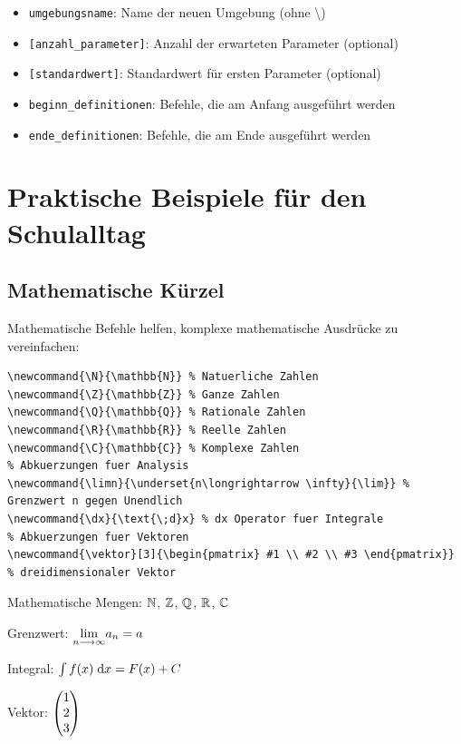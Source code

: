 \begin{itemize}
    \item \texttt{umgebungsname}: Name der neuen Umgebung (ohne \textbackslash)
    \item \texttt{[anzahl\_parameter]}: Anzahl der erwarteten Parameter (optional)
    \item \texttt{[standardwert]}: Standardwert für ersten Parameter (optional)
    \item \texttt{beginn\_definitionen}: Befehle, die am Anfang ausgeführt werden
    \item \texttt{ende\_definitionen}: Befehle, die am Ende ausgeführt werden
\end{itemize}

\newpage


\section{Praktische Beispiele für den Schulalltag}



\subsection{Mathematische Kürzel}

Mathematische Befehle helfen, komplexe mathematische Ausdrücke zu vereinfachen:

\begin{lstlisting}[style=latex]
% Zahlenbereiche
\newcommand{\N}{\mathbb{N}} % Natuerliche Zahlen
\newcommand{\Z}{\mathbb{Z}} % Ganze Zahlen
\newcommand{\Q}{\mathbb{Q}} % Rationale Zahlen
\newcommand{\R}{\mathbb{R}} % Reelle Zahlen
\newcommand{\C}{\mathbb{C}} % Komplexe Zahlen
% Abkuerzungen fuer Analysis
\newcommand{\limn}{\underset{n\longrightarrow \infty}{\lim}} % Grenzwert n gegen Unendlich
\newcommand{\dx}{\text{\;d}x} % dx Operator fuer Integrale
% Abkuerzungen fuer Vektoren
\newcommand{\vektor}[3]{\begin{pmatrix} #1 \\ #2 \\ #3 \end{pmatrix}} % dreidimensionaler Vektor
\end{lstlisting}

\begin{ausgabe}
Mathematische Mengen: $\N$, $\Z$, $\Q$, $\R$, $\C$

Grenzwert: $\limn a_n = a$

Integral: $\int f(x) \dx = F(x) + C$

Vektor: $\vektor{1}{2}{3}$
\end{ausgabe}




